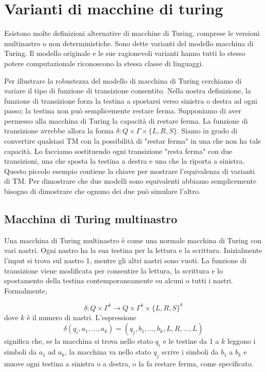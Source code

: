 \section{Varianti di macchine di turing}
Esistono molte definizioni alternative di macchine di Turing, comprese le versioni multinastro o non deterministiche. Sono dette varianti del modello macchina di Turing. Il modello originale e le sue ragionevoli varianti hanno tutti lo stesso potere computazionale riconoscono la stessa classe di linguaggi. 

Per illustrare la robustezza del modello di macchina di Turing cerchiamo di variare il tipo di funzione di transizione consentito. Nella nostra definizione, la funzione di transizione forza la testina a spostarsi verso sinistra o destra ad ogni passo; la testina non può semplicemente restare ferma. Supponiamo di aver permesso alla macchina di Turing la capacità di restare ferma. La funzione di transizione avrebbe allora la forma $\delta: Q\times \Gamma\times \{L,R,S\}$. Siamo in grado di convertire qualsiasi TM con la possibilità di "restar ferma" in una che non ha tale capacità. Lo facciamo sostituendo ogni transizione "resta ferma" con due transizioni, una che sposta la testina a destra e una che la riporta a sinistra. Questo piccolo esempio contiene la chiave per mostrare l'equivalenza di varianti di TM. Per dimostrare che due modelli sono equivalenti abbiamo semplicemente bisogno di dimostrare che ognuno dei due può simulare l'altro.

\subsection{Macchina di Turing multinastro}
Una macchina di Turing multinastro è come una normale macchina di Turing con vari nastri. Ogni nastro ha la sua testina per la lettura e la scrittura. Inizialmente l'input si trova sul nastro 1, mentre gli altri nastri sono vuoti. La funzione di transizione viene modificata per consentire la lettura, la scrittura e lo spostamento della testina contemporaneamente su alcuni o tutti i nastri. Formalmente,

\begin{equation*}
    \delta: Q\times\Gamma^k\rightarrow Q\times \Gamma^k\times \{L, R, S\}^k
\end{equation*}
dove $k$ è il numero di nastri. L'espressione
\begin{equation*}
    \delta( q_{i}, a_{1} ,...,a_k)=(q_j ,b_1 ,...,b_k ,L,R,...,L)
\end{equation*}
significa che, se la macchina si trova nello stato $q_{i}$ e le testine da 1 a $k$ leggono i simboli da $a_{1}$ ad $a_{k}$, la macchina va nello stato $q_{j}$ scrive i simboli da $b_{1}$ a $b_{k}$ e muove ogni testina a sinistra o a destra, o la fa restare ferma, come specificato.

